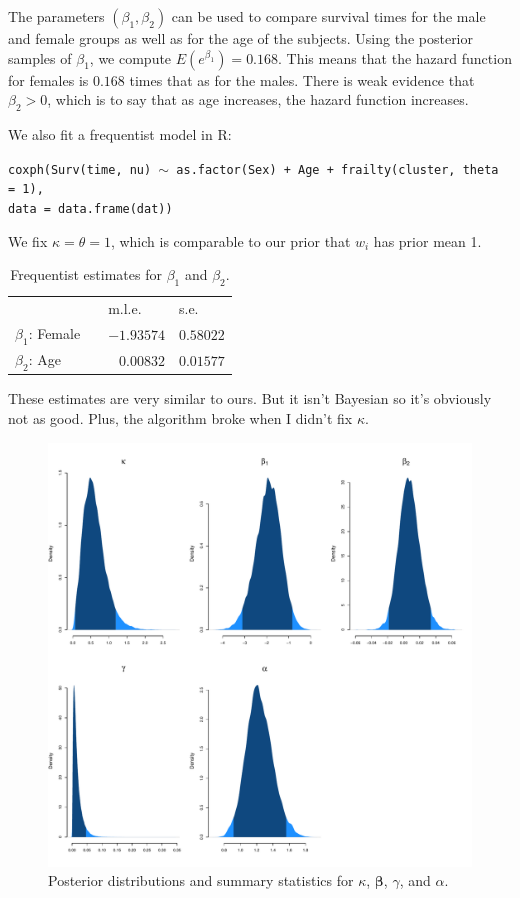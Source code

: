 \documentclass[12pt]{article}
\newcommand{\m}[1]{\mathbf{\bm{#1}}}
\begin{document}
\noindent The parameters $(\beta_1,\beta_2)$ can be used to compare survival times for the male and female groups as well as for the age of the subjects. Using the posterior samples of $\beta_1$, we compute $E(e^{\beta_1})=0.168$. This means that the hazard function for females is $0.168$ times that as for the males. There is weak evidence that $\beta_2>0$, which is to say that as age increases, the hazard function increases.

\bigskip

\noindent We also fit a frequentist model in R:
\smallskip

\noindent \texttt{coxph(Surv(time, nu) $\sim$ as.factor(Sex) + Age + frailty(cluster, theta = 1), \\
data = data.frame(dat))}
\smallskip

\noindent We fix $\kappa=\theta=1$, which is comparable to our prior that $w_i$ has prior mean 1.

\begin{table}[ht]
\centering
\begin{tabular}{lcrr}
\hline\hline
& & \multicolumn{1}{l}{m.l.e.} & \multicolumn{1}{l}{s.e.} \\
$\beta_1$: Female   & & $-1.93574$ & $0.58022$ \\
$\beta_2$: Age      & & $ 0.00832$ & $0.01577$ \\
\hline\hline
\end{tabular}
\caption{Frequentist estimates for $\beta_1$ and $\beta_2$.}
\end{table}


\noindent These estimates are very similar to ours. But it isn't Bayesian so it's obviously not as good. Plus, the algorithm broke when I didn't fix $\kappa$.


\newpage
\begin{figure}
\centering
\includegraphics[scale=0.5]{figs/posterior.pdf}
\caption{Posterior distributions and summary statistics for $\kappa$, $\m{\beta}$, $\gamma$, and $\alpha$.}
\end{figure}
\end{document}

